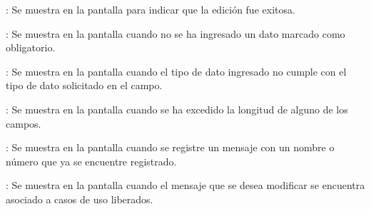 \begin{Citemize}
	\item {}: Se muestra en la pantalla  para indicar que la edición fue exitosa.
	\item {}: Se muestra en la pantalla  cuando no se ha ingresado un dato marcado como obligatorio.
	\item {}: Se muestra en la pantalla  cuando el tipo de dato ingresado no cumple con el tipo de dato solicitado en el campo.
	\item {}: Se muestra en la pantalla  cuando se ha excedido la longitud de alguno de los campos.
	\item {}: Se muestra en la pantalla  cuando se registre un mensaje con un nombre o número que ya se encuentre registrado.
	\item {}: Se muestra en la pantalla  cuando el mensaje que se desea modificar se encuentra asociado a casos de uso liberados.
\end{Citemize}
